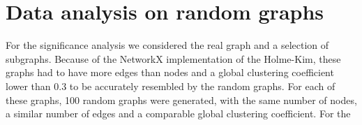 \section{Data analysis on random graphs}

For the significance analysis we considered the real graph and a selection of subgraphs. Because of the NetworkX implementation of the Holme-Kim, these graphs had to have more edges than nodes and a global clustering coefficient lower than 0.3 to be accurately resembled by the random graphs. For each of these graphs, 100 random graphs were generated, with the same number of nodes, a similar number of edges and a comparable global clustering coefficient. For the 